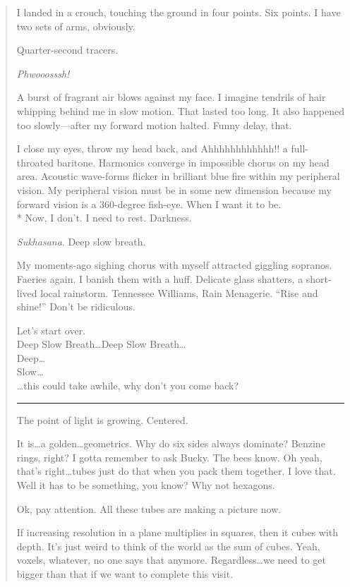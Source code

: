 \documentclass{UIdahoMastersThesis}
\begin{document}
\begin{quote}
{
I landed in a crouch, touching the ground in four points. Six points. I have two sets of arms, obviously.

Quarter-second tracers.

\textit{Phwooosssh!}

A burst of fragrant air blows against my face. I imagine tendrils of hair whipping behind me in slow motion. That lasted too long. It also happened too slowly---after my forward motion halted. Funny delay, that.

I close my eyes, throw my head back, and Ahhhhhhhhhhhh!! a full-throated baritone. Harmonics converge in impossible chorus on my head area. Acoustic wave-forms flicker in brilliant blue fire within my peripheral vision. My peripheral vision must be in some new dimension because my forward vision is a 360-degree fish-eye. When I want it to be.
\\*
Now, I don't. I need to rest. Darkness.

\textit{Sukhasana}. Deep slow breath.

My moments-ago sighing chorus with myself attracted giggling sopranos. Faeries again. I banish them with a huff. Delicate glass shatters, a short-lived local rainstorm. Tennessee Williams, Rain Menagerie. ``Rise and shine!'' Don't be ridiculous.

Let's start over.\\

Deep Slow Breath\ldots Deep Slow Breath\ldots \\
Deep\ldots \\
Slow\ldots \\
\ldots this could take awhile, why don't you come back?

\noindent\rule{2cm}{0.4pt}


The point of light is growing. Centered.

It is\ldots a golden\ldots geometrics. Why do six sides always dominate? Benzine rings, right? I gotta remember to ask Bucky. The bees know. Oh yeah, that's right\ldots tubes just do that when you pack them together. I love that. Well it has to be something, you know? Why not hexagons.

Ok, pay attention. All these tubes are making a picture now.

If increasing resolution in a plane multiplies in squares, then it cubes with depth. It's just weird to think of the world as the sum of cubes. Yeah, voxels, whatever, no one says that anymore. Regardless\ldots we need to get bigger than that if we want to complete this visit.

}
\end{quote}
\end{document}
